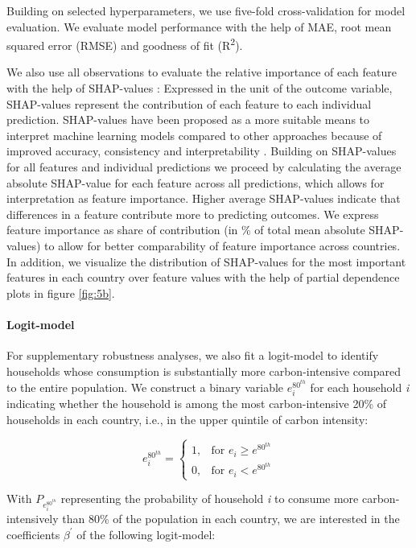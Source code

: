 \documentclass[12pt, a4paper]{article}
\begin{document}
Building on selected hyperparameters, we use five-fold cross-validation for model evaluation. We evaluate model performance with the help of MAE, root mean squared error (RMSE) and goodness of fit (R\textsuperscript{2}). 

We also use all observations to evaluate the relative importance of each feature with the help of SHAP-values \autocite{Lundberg.2017}: Expressed in the unit of the outcome variable, SHAP-values represent the contribution of each feature to each individual prediction. SHAP-values have been proposed as a more suitable means to interpret machine learning models compared to other approaches because of improved accuracy, consistency and interpretability \autocite{Lundberg.2020}. Building on SHAP-values for all features and individual predictions we proceed by calculating the average absolute SHAP-value for each feature across all predictions, which allows for interpretation as feature importance. Higher average SHAP-values indicate that differences in a feature contribute more to predicting outcomes. We express feature importance as share of contribution (in \% of total mean absolute SHAP-values) to allow for better comparability of feature importance across countries. In addition, we visualize the distribution of SHAP-values for the most important features in each country over feature values with the help of partial dependence plots in figure \ref{fig:5b}. 

\paragraph{Logit-model} For supplementary robustness analyses, we also fit a logit-model to identify households whose consumption is substantially more carbon-intensive compared to the entire population. We construct a binary variable $e_{i}^{80^{th}}$ for each household \textit{i} indicating whether the household is among the most carbon-intensive 20\% of households in each country, i.e., in the upper quintile of carbon intensity:

\begin{equation}\label{eq:logit}
    e_{i}^{80^{th}} =
    \begin{cases}
    1, & \text{for }  e_{i} \geq e^{80^{th}} \\
    0, & \text{for }  e_{i} < e^{80^{th}}
    \end{cases}
\end{equation}

With $P_{e_{i}^{80^{th}}}$ representing the probability of household \textit{i} to consume more carbon-intensively than 80\% of the population in each country, we are interested in the coefficients $\beta^{'}$ of the following logit-model:
\end{document}
